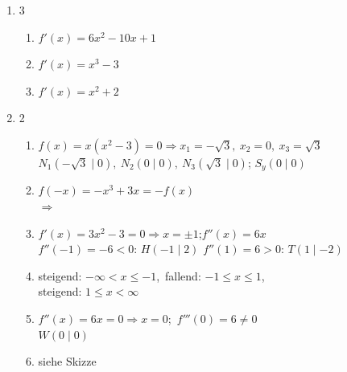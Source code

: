 \vfill
\Punktetabelle

\bigskip
\Notenschluessel

\ifloesung
\begin{loesungsteil}
\begin{enumerate}
  \item
  \begin{multicols}{3}
  \begin{enumerate}
    \item $\boxed{f'(x) = 6x^2 - 10x + 1}$
    \item $\boxed{f'(x) = x^3 - 3}$
    \item $\boxed{f'(x) = x^2 + 2}$
  \end{enumerate}
  \end{multicols}

  \item
  \begin{multicols}{2}
  \begin{enumerate}
    \item $f(x) = x(x^2 - 3) = 0 \Rightarrow x_1 = -\sqrt3,\ x_2 = 0,\ x_3 = \sqrt3$\\
          $\boxed{N_1(-\sqrt3 \mid 0),\ N_2(0 \mid 0),\ N_3(\sqrt3 \mid 0)}$;
          $\boxed{S_y(0 \mid 0)}$
    \item $f(-x) = -x^3 + 3x = -f(x)$\\
          $\Rightarrow$ 
    \item $f'(x) = 3x^2 - 3 = 0 \Rightarrow x = \pm 1$;\quad $f''(x) = 6x$\\
          $f''(-1) = -6 < 0$: $\boxed{H(-1 \mid 2)}$\quad
          $f''(1) = 6 > 0$: $\boxed{T(1 \mid -2)}$
    \item steigend: $\boxed{-\infty < x \le -1}$,\ fallend: $\boxed{-1 \le x \le 1}$,\\
          steigend: $\boxed{1 \le x < \infty}$
    \item $f''(x) = 6x = 0 \Rightarrow x = 0$;\ $f'''(0) = 6 \ne 0$\\
          $\boxed{W(0 \mid 0)}$
    \item siehe Skizze
  \end{enumerate}
  \end{multicols}
  \begin{center}
  \end{center}


\end{enumerate}
\end{loesungsteil}
